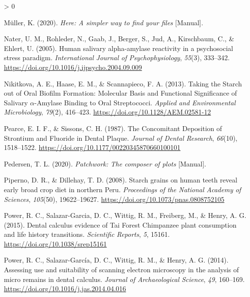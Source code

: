 \documentclass[
]{article}
\newlength{\cslhangindent}
\newenvironment{CSLReferences}[2] %
 {%
  \setlength{\parindent}{0pt}
  \ifodd #1 \everypar{\setlength{\hangindent}{\cslhangindent}}\ignorespaces\fi
  \ifnum #2 > 0
  \setlength{\parskip}{#2\baselineskip}
  \fi
 }%
 {}
\begin{document}
\begin{CSLReferences}{1}{0}
\leavevmode\hypertarget{ref-R-here}{}%
Müller, K. (2020). \emph{Here: A simpler way to find your files} {[}Manual{]}.

\leavevmode\hypertarget{ref-naterHumanAmylase2005}{}%
Nater, U. M., Rohleder, N., Gaab, J., Berger, S., Jud, A., Kirschbaum, C., \& Ehlert, U. (2005). Human salivary alpha-amylase reactivity in a psychosocial stress paradigm. \emph{International Journal of Psychophysiology}, \emph{55}(3), 333--342. \url{https://doi.org/10.1016/j.ijpsycho.2004.09.009}

\leavevmode\hypertarget{ref-nikitkovaStarchBiofilms2013}{}%
Nikitkova, A. E., Haase, E. M., \& Scannapieco, F. A. (2013). Taking the {Starch} out of {Oral Biofilm Formation}: Molecular {Basis} and {Functional Significance} of {Salivary} {\(\alpha\)}-{Amylase Binding} to {Oral Streptococci}. \emph{Applied and Environmental Microbiology}, \emph{79}(2), 416--423. \url{https://doi.org/10.1128/AEM.02581-12}

\leavevmode\hypertarget{ref-pearceConcomitantDepositionStrontium1987}{}%
Pearce, E. I. F., \& Sissons, C. H. (1987). The {Concomitant Deposition} of {Strontium} and {Fluoride} in {Dental Plaque}. \emph{Journal of Dental Research}, \emph{66}(10), 1518--1522. \url{https://doi.org/10.1177/00220345870660100101}

\leavevmode\hypertarget{ref-R-patchwork}{}%
Pedersen, T. L. (2020). \emph{Patchwork: The composer of plots} {[}Manual{]}.

\leavevmode\hypertarget{ref-pipernoStarchGrains2008}{}%
Piperno, D. R., \& Dillehay, T. D. (2008). Starch grains on human teeth reveal early broad crop diet in northern {Peru}. \emph{Proceedings of the National Academy of Sciences}, \emph{105}(50), 19622--19627. \url{https://doi.org/10.1073/pnas.0808752105}

\leavevmode\hypertarget{ref-powerChimpCalculus2015}{}%
Power, R. C., Salazar-Garcia, D. C., Wittig, R. M., Freiberg, M., \& Henry, A. G. (2015). Dental calculus evidence of {Tai Forest Chimpanzee} plant consumption and life history transitions. \emph{Scientific Reports}, \emph{5}, 15161. \url{https://doi.org/10.1038/srep15161}

\leavevmode\hypertarget{ref-powerSEMCalculus2014}{}%
Power, R. C., Salazar-García, D. C., Wittig, R. M., \& Henry, A. G. (2014). Assessing use and suitability of scanning electron microscopy in the analysis of micro remains in dental calculus. \emph{Journal of Archaeological Science}, \emph{49}, 160--169. \url{https://doi.org/10.1016/j.jas.2014.04.016}


\end{CSLReferences}
\end{document}
